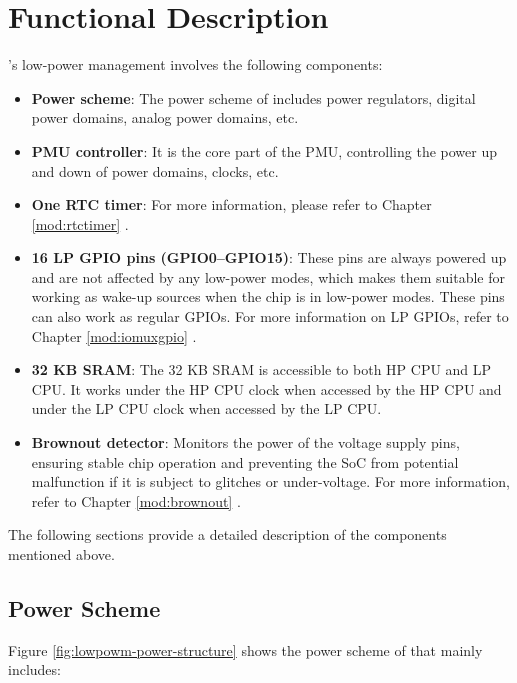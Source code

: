 \documentclass[main\_\_EN.tex]{subfiles}
\begin{document}
\section{Functional Description}

\chipname{}'s low-power management involves the following components:

\begin{itemize}
    \item \textbf{Power scheme}: The power scheme of \chipname{} includes power regulators, digital power domains, analog power domains, etc.

    \item \textbf{PMU controller}: It is the core part of the PMU, controlling the power up and down of power domains, clocks, etc.

    \item \textbf{One RTC timer}: For more information, please refer to Chapter \ref{mod:rtctimer} \textit{}.

    \item \textbf{16 LP GPIO pins (GPIO0–GPIO15)}: These pins are always powered up and are not affected by any low-power modes, which makes them suitable for working as wake-up sources when the chip is in low-power modes. These pins can also work as regular GPIOs. For more information on LP GPIOs, refer to Chapter \ref{mod:iomuxgpio} \textit{}.

    \item \textbf{32 KB SRAM}: The 32 KB SRAM is accessible to both HP CPU and LP CPU. It works under the HP CPU clock when accessed by the HP CPU and under the LP CPU clock when accessed by the LP CPU.

    \item \textbf{Brownout detector}: Monitors the power of the voltage supply pins, ensuring stable chip operation and preventing the SoC from potential malfunction if it is subject to glitches or under-voltage. For more information, refer to Chapter \ref{mod:brownout} \textit{}.
\end{itemize}

The following sections provide a detailed description of the components mentioned above.

\subsection{Power Scheme}

Figure \ref{fig:lowpowm-power-structure} shows the power scheme of \chipname{} that mainly includes:
\end{document}
